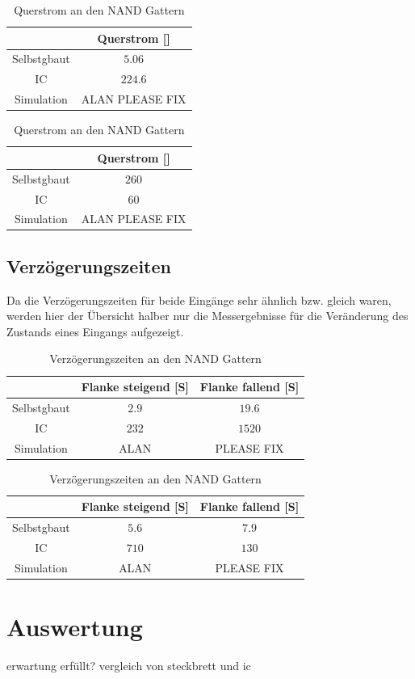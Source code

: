 \documentclass[11pt, a4paper]{article}
\begin{document}
\begin{table}[H]
	\center
	\begin{tabular}{c|c}
	& Querstrom [\si{\micro}]	\\ \hline
	Selbstgbaut & $5.06$ 		\\
	IC 			& $224.6$ 		\\
	Simulation 	& ALAN PLEASE FIX\\
	\end{tabular}
	\caption{Querstrom an den NOR Gattern}
	\label{querstromNAND}



	\center
	\begin{tabular}{c|c}
	& Querstrom [\si{\micro}]	\\ \hline
	Selbstgbaut & $260$ 		\\
	IC 			& $60$ 			\\
	Simulation 	& ALAN PLEASE FIX\\
	\end{tabular}
	\caption{Querstrom an den NAND Gattern}
	\label{querstromNAND}
\end{table}


\subsection*{Verzögerungszeiten}
Da die Verzögerungszeiten für beide Eingänge sehr ähnlich bzw. gleich waren, werden hier der Übersicht halber nur die Messergebnisse für die Veränderung des Zustands eines Eingangs aufgezeigt.

\begin{table}[H]
	\center
	\begin{tabular}{c|c|c}
	& Flanke steigend [\si{\micro}S] & Flanke fallend [\si{\micro}S] 	\\ \hline
	Selbstgbaut & $2.9$ 	& $19.6$	\\
	IC 			& $232$ 	& $1520$	\\
	Simulation 	& ALAN		& PLEASE FIX\\
	\end{tabular}
	\caption{Verzögerungszeiten an den NOR Gattern}
	\label{verzögerungszeitenNOR}



	\center
	\begin{tabular}{c|c|c}
	& Flanke steigend [\si{\micro}S] & Flanke fallend [\si{\micro}S] 	\\ \hline
	Selbstgbaut & $5.6$ 	& $7.9$	\\
	IC 			& $710$ 	& $130$	\\
	Simulation 	& ALAN		& PLEASE FIX\\
	\end{tabular}
	\caption{Verzögerungszeiten an den NAND Gattern}
	\label{verzögerungszeitenNAND}
\end{table}


\section*{Auswertung}
erwartung erfüllt? vergleich von steckbrett und ic
\end{document}
